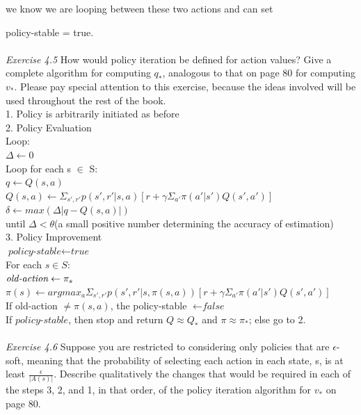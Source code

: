 \documentclass{article}
\begin{document}
we know we are looping between these two actions and can set 

policy-stable = true.
\\\\
\textit{Exercise 4.5} How would policy iteration be defined for action values? Give a complete
algorithm for computing $q_{*}$, analogous to that on page 80 for computing $v_{*}$. Please pay
special attention to this exercise, because the ideas involved will be used throughout the
rest of the book. 
\\

1. Policy is arbitrarily initiated as before\\

2. Policy Evaluation\\

\indent Loop:\\
\indent \indent $\Delta \leftarrow 0$\\
\indent \indent Loop for each s $\in$ S:\\
\indent \indent \indent $\textit{q} \leftarrow Q(s,a)$\\
\indent \indent \indent $Q(s,a) \leftarrow \Sigma_{s', r'}p(s', r'|s, a)[r + \gamma \Sigma_{a'}\pi(a'|s')Q(s', a')]$\\
\indent \indent \indent  $\delta \leftarrow max(\Delta|\textit{q} - Q(s,a)|)$\\
\indent until $\Delta < \theta$(a small positive number determining the accuracy of estimation) \\

3. Policy Improvement\\

$\textit{policy-stable} \leftarrow \textit{true}$\\
\indent For each $s \in S:$\\
\indent \indent $\textit{old-action} \leftarrow \pi_{s} \\$
\indent \indent $\pi(s) \leftarrow argmax_{a}\Sigma_{s', r'}p(s', r'|s, \pi(s,a))[r + \gamma \Sigma_{a'}\pi(a'|s')Q(s', a')]$\\
\indent \indent If old-action $\neq \pi(s,a)$, the policy-stable $\leftarrow \textit{false}$\\
\indent If $\textit{policy-stable}$, then stop and return $Q \approx Q_{*}$ and $\pi \approx \pi_{*}$; else go to 2.
\\\\
\textit{Exercise 4.6} Suppose you are restricted to considering only policies that are $\epsilon$-soft,
meaning that the probability of selecting each action in each state, s, is at least $\frac{\epsilon}{|A(s)|}$.
Describe qualitatively the changes that would be required in each of the steps 3, 2, and 1,
in that order, of the policy iteration algorithm for $v_{*}$ on page 80. 
\\
\end{document}
